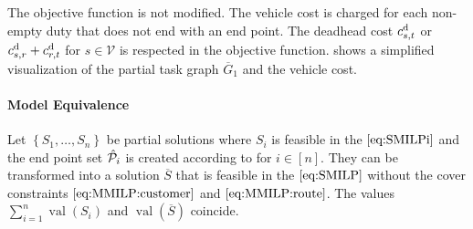 The objective function is not modified. The vehicle cost is charged for each non-empty duty that does not end with an end point. The deadhead cost $c^{\operatorname{d}}_{s,t}$ or $c^{\operatorname{d}}_{s,r} + c^{\operatorname{d}}_{r,t}$ for ${s\in\mathcal{V}}$ is respected in the objective function.  shows a simplified visualization of the partial task graph $\overline{G}_1$ and the vehicle cost.

\paragraph{Model Equivalence} \parfill

\begin{theorem}
\label{thm:equivalence_heuristic_SMILP}

Let ${\left\{S_1,\dots,S_n\right\}}$ be partial solutions where $S_i$ is feasible in the $\eqref{eq:SMILPi}$ and the end point set $\hat{\mathcal{P}}_i$ is created according to  for ${i\in[n]}$. They can be transformed into a solution $\overline{S}$ that is feasible in the $\eqref{eq:SMILP}$ without the cover constraints $\eqref{eq:MMILP:customer}$ and $\eqref{eq:MMILP:route}$. The values ${\sum_{i=1}^n \operatorname{val}\left(S_i\right)}$ and ${\operatorname{val}(\overline{S})}$ coincide.

\end{theorem}

